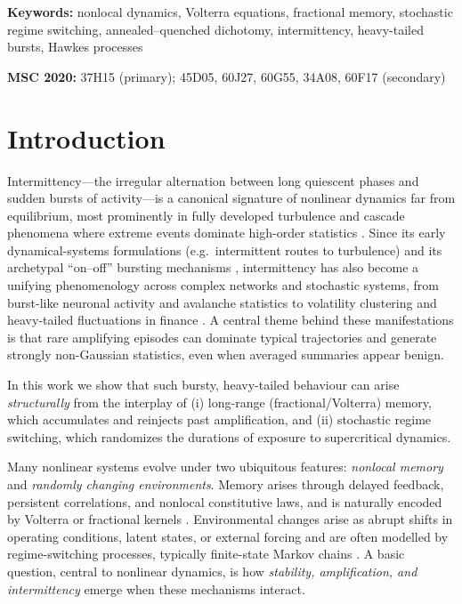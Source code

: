 \documentclass[12pt,a4paper]{article}
\theoremstyle{plain}
\theoremstyle{definition}
\theoremstyle{remark}
\begin{document}
\begin{titlepage}
\begin{center}
\vspace{0.5cm}

\noindent\textbf{Keywords:} nonlocal dynamics, Volterra equations, fractional memory, stochastic regime switching, annealed--quenched dichotomy, intermittency, heavy-tailed bursts, Hawkes processes

\vspace{0.3cm}

\noindent\textbf{MSC 2020:} 37H15 (primary); 45D05, 60J27, 60G55, 34A08, 60F17 (secondary)

\end{center}
\end{titlepage}

\tableofcontents
\newpage

	\section{Introduction}
	\label{sec:intro}
	
	
	Intermittency---the irregular alternation between long quiescent phases and sudden bursts of activity---is a canonical signature of nonlinear dynamics far from equilibrium, most prominently in fully developed turbulence and cascade phenomena where extreme events dominate high-order statistics \cite{frisch1995turbulence,she1994universal}. Since its early dynamical-systems formulations (e.g.\ intermittent routes to turbulence) \cite{pomeau1980intermittent} and its archetypal ``on--off'' bursting mechanisms \cite{platt1993onoff}, intermittency has also become a unifying phenomenology across complex networks and stochastic systems, from burst-like neuronal activity and avalanche statistics \cite{beggs2003neuronal} to volatility clustering and heavy-tailed fluctuations in finance \cite{cont2001empirical}. A central theme behind these manifestations is that rare amplifying episodes can dominate typical trajectories and generate strongly non-Gaussian statistics, even when averaged summaries appear benign.
	
	In this work we show that such bursty, heavy-tailed behaviour can arise \emph{structurally} from the interplay of (i) long-range (fractional/Volterra) memory, which accumulates and reinjects past amplification, and (ii) stochastic regime switching, which randomizes the durations of exposure to supercritical dynamics.
		
	Many nonlinear systems evolve under two ubiquitous features: \emph{nonlocal memory} and \emph{randomly changing environments}.
	Memory arises through delayed feedback, persistent correlations, and nonlocal constitutive laws, and is naturally encoded by
	Volterra or fractional kernels \cite{pruss1993evolution,bazhlekova2000fractional}.
	Environmental changes arise as abrupt shifts in operating conditions, latent states, or external forcing and are often modelled by
	regime-switching processes, typically finite-state Markov chains \cite{mao1999,yin2010}.
	A basic question, central to nonlinear dynamics, is how \emph{stability, amplification, and intermittency} emerge when these mechanisms
	interact.
	
\end{document}
